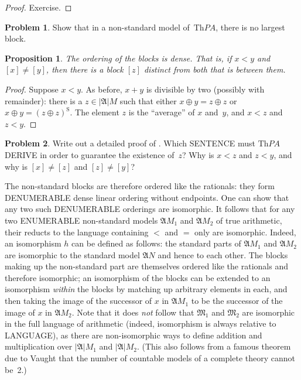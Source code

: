 \documentclass[10pt,a4paper]{article}
\makeatletter
\newcommand*{\olup}[1]{\MakeUppercase{#1}}
\theoremstyle{plain}
\newtheorem{prop}[thm]{Proposition}
\theoremstyle{definition}
\newtheorem{prob}{Problem}[section]
\theoremstyle{remark}
\newenvironment{explain}{}{}
\newcommand*{\ollabel}[1]{\label{#1}}
\newcommand{\olref}{\@ifnextchar[{\olref@i}{\olref@final}}
\def\olref@i[#1]{\@ifnextchar[{\olref@ii}{\olref@final}}
\def\olref@ii[#1]{\@ifnextchar[{\olref@iii}{\olref@final}}
\def\olref@iii[#1]{\olref@final}
\def\olref@final#1{\ref{#1}}
\providecommand{\Struct}{\ensuremath{\mathfrak{A}}}
\providecommand{\Domain}{\ensuremath{|\mathfrak{A}|}}
\providecommand{\Th}{\ensuremath{\mathrm{Th}}}
\providecommand{\nssucc}{\mathrm{S}}
\providecommand{\nsplus}{\mathbin{+}}
\providecommand{\nsless}{<}
\makeatother
\begin{document}
\begin{proof}
Exercise.
\end{proof}

\begin{prob}
Show that in a non-standard model of~$\Th{PA}$, there is no largest
block.
\end{prob}

\begin{prop}
\ollabel{prop:blocks-dense}
The ordering of the blocks is dense. That is, if $x \nsless y$ and
$[x] \neq [y]$, then there is a block $[z]$ distinct from both that is
between them.
\end{prop}

\begin{proof}
Suppose $x \nsless y$. As before, $x \nsplus y$ is divisible by two
(possibly with remainder): there is a $z \in \Domain{M}$ such that
either $x \oplus y = z \oplus z$ or $x \oplus y = (z \oplus
z)^\nssucc$. The element $z$ is the ``average'' of $x$ and~$y$, and $x
\nsless z$ and $z \nsless y$.
\end{proof}

\begin{prob}
Write out a detailed proof of
\olref[mod][mar][mpa]{prop:blocks-dense}. Which \olup{sentence} must
$\Th{PA}$ \olup{derive} in order to guarantee the existence of~$z$? Why
is $x \nsless z$ and $z \nsless y$, and why is $[x] \neq [z]$ and $[z]
\neq [y]$?
\end{prob}

\begin{explain}
The non-standard blocks are therefore ordered like the rationals: they
form \olup{denumerable} dense linear ordering without endpoints.  One can show
that any two such \olup{denumerable} orderings are isomorphic. It follows
that for any two \olup{enumerable} non-standard models $\Struct{M}_1$ and
$\Struct{M_2}$ of true arithmetic, their reducts to the language
containing $<$ and $=$ only are isomorphic. Indeed, an isomorphism $h$
can be defined as follows: the standard parts of $\Struct{M_1}$ and
$\Struct{M_2}$ are isomorphic to the standard model $\Struct{N}$ and
hence to each other. The blocks making up the non-standard part are
themselves ordered like the rationals and therefore isomorphic; an
isomorphism of the blocks can be extended to an isomorphism
\emph{within} the blocks by matching up arbitrary elements in each,
and then taking the image of the successor of $x$ in $\Struct{M_1}$ to
be the successor of the image of $x$ in $\Struct{M_2}$. Note that it
does \emph{not} follow that $\mathfrak{M}_1$ and $\mathfrak{M}_2$ are
isomorphic in the full language of arithmetic (indeed, isomorphism is
always relative to \olup{language}), as there are non-isomorphic ways to
define addition and multiplication over $\Domain{M_1}$ and
$\Domain{M_2}$. (This also follows from a famous theorem due to Vaught
that the number of countable models of a complete theory cannot be~2.)
\end{explain}
\end{document}
